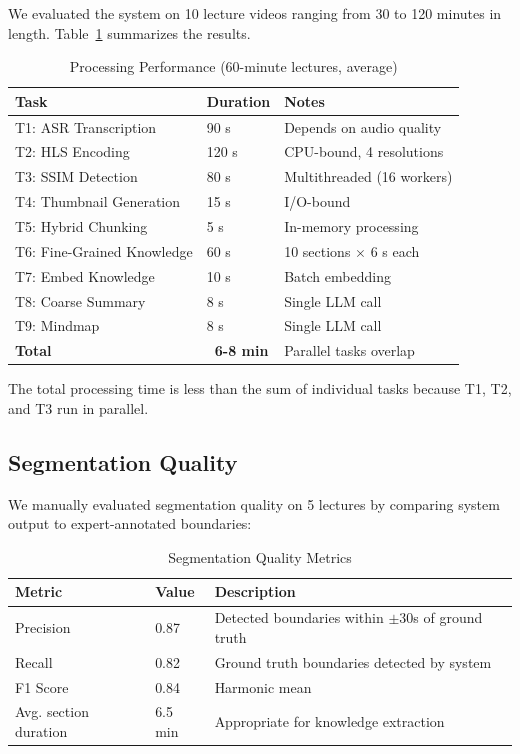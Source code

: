 \documentclass[12pt,a4paper]{article}
\begin{document}
We evaluated the system on 10 lecture videos ranging from 30 to 120 minutes in length. Table~\ref{tab:processing-performance} summarizes the results.

\begin{table}[H]
    \centering
    \caption{Processing Performance (60-minute lectures, average)}
    \label{tab:processing-performance}
    \begin{tabular}{@{}lll@{}}
        \toprule
        \textbf{Task} & \textbf{Duration} & \textbf{Notes} \\ \midrule
        T1: ASR Transcription & 90 s & Depends on audio quality \\
        T2: HLS Encoding & 120 s & CPU-bound, 4 resolutions \\
        T3: SSIM Detection & 80 s & Multithreaded (16 workers) \\
        T4: Thumbnail Generation & 15 s & I/O-bound \\
        T5: Hybrid Chunking & 5 s & In-memory processing \\
        T6: Fine-Grained Knowledge & 60 s & 10 sections $\times$ 6 s each \\
        T7: Embed Knowledge & 10 s & Batch embedding \\
        T8: Coarse Summary & 8 s & Single LLM call \\
        T9: Mindmap & 8 s & Single LLM call \\ \midrule
        \textbf{Total} & \textbf{~6-8 min} & Parallel tasks overlap \\ \bottomrule
    \end{tabular}
\end{table}

The total processing time is less than the sum of individual tasks because T1, T2, and T3 run in parallel.

\subsection{Segmentation Quality}

We manually evaluated segmentation quality on 5 lectures by comparing system output to expert-annotated boundaries:

\begin{table}[H]
    \centering
    \caption{Segmentation Quality Metrics}
    \begin{tabular}{@{}lll@{}}
        \toprule
        \textbf{Metric} & \textbf{Value} & \textbf{Description} \\ \midrule
        Precision & 0.87 & Detected boundaries within $\pm$30s of ground truth \\
        Recall & 0.82 & Ground truth boundaries detected by system \\
        F1 Score & 0.84 & Harmonic mean \\
        Avg. section duration & 6.5 min & Appropriate for knowledge extraction \\ \bottomrule
    \end{tabular}
\end{table}
\end{document}
